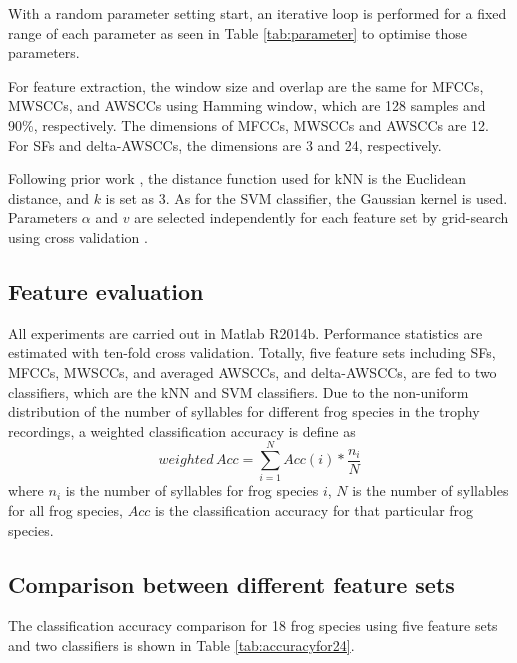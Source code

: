 With a random parameter setting start, an iterative loop is performed for a fixed range of each parameter as seen in Table \ref{tab:parameter} to optimise those parameters.

For feature extraction, the window size and overlap are the same for MFCCs, MWSCCs, and AWSCCs using Hamming window, which are 128 samples and 90\%, respectively. The dimensions of MFCCs, MWSCCs and AWSCCs are 12. For SFs and delta-AWSCCs, the dimensions are 3 and 24, respectively.

Following prior work \citep{huang2009frog, han2011acoustic, Xie1504:Acoustic}, the distance function used for kNN is the Euclidean distance, and $k$ is set as 3. As for the SVM classifier, the Gaussian kernel is used. Parameters $\alpha$ and $v$ are selected independently for each feature set by grid-search using cross validation \citep{hsu2003practical}. 

\subsection{Feature evaluation}
All experiments are carried out in Matlab R2014b. Performance statistics are estimated with ten-fold cross validation. Totally, five feature sets including SFs, MFCCs, MWSCCs, and averaged AWSCCs, and delta-AWSCCs, are fed to two classifiers, which are the kNN and SVM classifiers. Due to the non-uniform distribution of the number of syllables for different frog species in the trophy recordings, a weighted classification accuracy is define as 
\begin{equation}
weighted \, Acc=\sum_{i=1}^{N}Acc(i)*\frac{n_{i}}{N}
\end{equation}
\noindent where $n_{i}$ is the number of syllables for frog species $i$, $N$ is the number of syllables for all frog species, $Acc$ is the classification accuracy for that particular frog species. 


\subsection{Comparison between different feature sets}
The classification accuracy comparison for 18 frog species using five feature sets and two classifiers is shown in Table \ref{tab:accuracyfor24}. 


